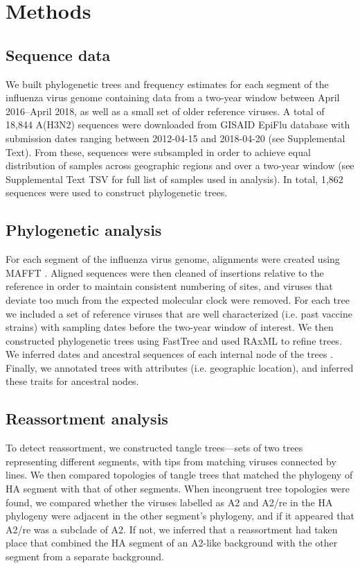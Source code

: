 \section*{Methods}
\subsection*{Sequence data}
We built phylogenetic trees and frequency estimates for each segment of the influenza virus genome containing data from a two-year window between April 2016--April 2018, as well as a small set of older reference viruses.
A total of 18,844 A(H3N2) sequences were downloaded from GISAID EpiFlu database with submission dates ranging between 2012-04-15 and 2018-04-20 (see Supplemental Text).
From these, sequences were subsampled in order to achieve equal distribution of samples across geographic regions and over a two-year window (see Supplemental Text TSV for full list of samples used in analysis).
In total, 1,862 sequences were used to construct phylogenetic trees.

\subsection*{Phylogenetic analysis}
For each segment of the influenza virus genome, alignments were created using MAFFT \citep{katoh_mafft_2013}.
Aligned sequences were then cleaned of insertions relative to the reference in order to maintain consistent numbering of sites, and viruses that deviate too much from the expected molecular clock were removed.
For each tree we included a set of reference viruses that are well characterized (i.e. past vaccine strains) with sampling dates before the two-year window of interest.
We then constructed phylogenetic trees using FastTree \citep{price_fasttree_2009} and used RAxML \citep{stamatakis_raxml_2014} to refine trees.
We inferred dates and ancestral sequences of each internal node of the trees \citep{Sagulenko2018}.
Finally, we annotated trees with attributes (i.e. geographic location), and inferred these traits for ancestral nodes.

\subsection*{Reassortment analysis}
To detect reassortment, we constructed tangle trees—sets of two trees representing different segments, with tips from matching viruses connected by lines.
We then compared topologies of tangle trees that matched the phylogeny of HA segment with that of other segments.
When incongruent tree topologies were found, we compared whether the viruses labelled as A2 and A2/re in the HA phylogeny were adjacent in the other segment’s phylogeny, and if it appeared that A2/re was a subclade of A2.
If not, we inferred that a reassortment had taken place that combined the HA segment of an A2-like background with the other segment from a separate background.

